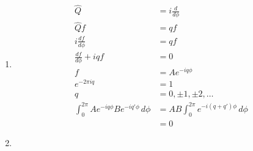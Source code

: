 \documentclass{article}
\begin{document}
\begin{enumerate}
  \item

        \begin{align*}
          \hat{Q}                                                  & = i \frac{d}{d \phi}                               \\
          \hat{Q} f                                                & = q f                                              \\
          i \frac{d f}{d \phi}                                     & = q f                                              \\
          \frac{d f}{d \phi} + i q f                               & = 0                                                \\
          f                                                        & = A e^{-i q \phi}                                  \\
          e^{-2 \pi i q}                                           & = 1                                                \\
          q                                                        & = 0, \pm 1, \pm 2, \ldots                          \\
          \int_0^{2 \pi} A e^{-i q \phi} B e^{-i q' \phi} \,d \phi & = A B \int_0^{2 \pi} e^{-i (q + q') \phi} \,d \phi \\
                                                                   & = 0
        \end{align*}

  \item


\end{enumerate}
\end{document}
